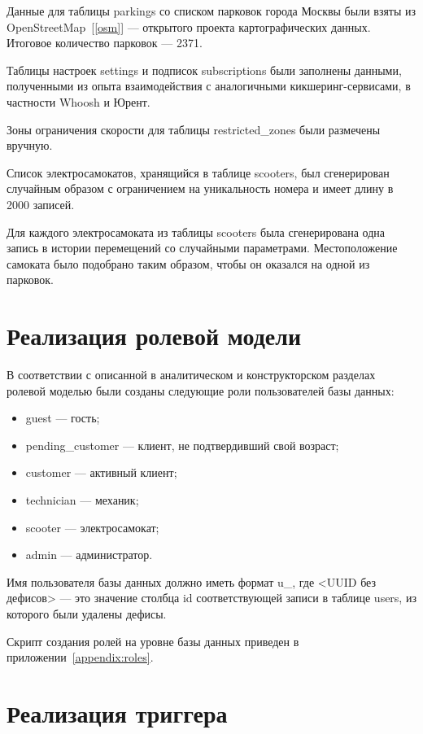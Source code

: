 Данные для таблицы parkings со списком парковок города Москвы были взяты из OpenStreetMap~[\ref{osm}] --- открытого проекта картографических данных. Итоговое количество парковок --- 2371.

Таблицы настроек settings и подписок subscriptions были заполнены данными, полученными из опыта взаимодействия с аналогичными кикшеринг-сервисами, в частности Whoosh и Юрент.

Зоны ограничения скорости для таблицы restricted\_zones были размечены вручную.

Список электросамокатов, хранящийся в таблице scooters, был сгенерирован случайным образом с ограничением на уникальность номера и имеет длину в 2000 записей.

Для каждого электросамоката из таблицы scooters была сгенерирована одна запись в истории перемещений со случайными параметрами. Местоположение самоката было подобрано таким образом, чтобы он оказался на одной из парковок.

\section{Реализация ролевой модели}

В соответствии с описанной в аналитическом и конструкторском разделах ролевой моделью были созданы следующие роли пользователей базы данных:

\begin{itemize}
    \item guest --- гость;
    \item pending\_customer --- клиент, не подтвердивший свой возраст;
    \item customer --- активный клиент;
    \item technician --- механик;
    \item scooter --- электросамокат;
    \item admin --- администратор.
\end{itemize}

Имя пользователя базы данных должно иметь формат u\_<UUID без дефисов>, где <UUID без дефисов> --- это значение столбца id соответствующей записи в таблице users, из которого были удалены дефисы.

Скрипт создания ролей на уровне базы данных приведен в приложении~\ref{appendix:roles}.

\section{Реализация триггера}

